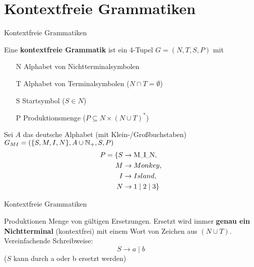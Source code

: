\section{Kontextfreie Grammatiken}
\begin{frame}{Kontextfreie Grammatiken}
	
	\begin{Definition}
		Eine \textbf{kontextfreie Grammatik} ist ein 4-Tupel $G = (N, T, S ,P)$ mit
		\begin{itemize}
			\item[N] Alphabet von Nichtterminalsymbolen
			\item[T] Alphabet von Terminalsymbolen ($N \cap T = \emptyset$)
			\item[S] Startsymbol ($S \in N$)
			\item[P] Produktionsmenge ($P \subseteq N \times (N \cup T)^\ast$)
		\end{itemize}
	\end{Definition}

	\pause
	\begin{Beispiel}
		Sei $A$ das deutsche Alphabet (mit Klein-/Großbuchstaben)\\
		$G_{MI} = (\{S, M, I, N\}, A \cup \mathbb{N}_+, S, P)$
		\begin{align*}
			P = \{S &\to \text{M\textvisiblespace I\textvisiblespace N}, \\
			M &\to Monkey, \\
			I &\to Island, \\
			N &\to 1 \mid 2 \mid 3 \}
		\end{align*}
	\end{Beispiel}
\end{frame}

\begin{frame}{Kontextfreie Grammatiken}
	\begin{block}{Produktionen}
		Menge von gültigen Ersetzungen. Ersetzt wird immer \textbf{genau ein Nichtterminal} (kontextfrei) mit einem Wort von Zeichen aus $(N \cup T)$.\\
		\pause
		Vereinfachende Schreibweise: $$S \to a \mid b$$ ($S$ kann durch a oder b ersetzt werden)
	\end{block}
\end{frame}

